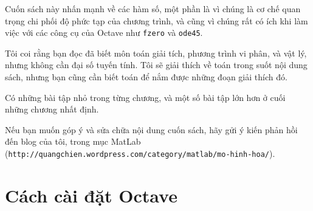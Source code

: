 \documentclass[12pt]{book}
\begin{document}
Cuốn sách này nhấn mạnh về các hàm số, một phần là vì chúng là 
cơ chế quan trọng chi phối độ phức tạp của chương trình, và cũng 
vì chúng rất có ích khi làm việc với các công cụ của Octave như 
{\tt fzero} và {\tt ode45}.

Tôi coi rằng bạn đọc đã biết môn toán giải tích, phương trình vi phân,
và vật lý, nhưng không cần đại số tuyến tính. Tôi sẽ giải thích về toán
trong suốt nội dung sách, nhưng bạn cũng cần biết toán để nắm được
những đoạn giải thích đó.

Có những bài tập nhỏ trong từng chương, và một số bài tập lớn hơn
ở cuối những chương nhất định.

Nếu bạn muốn góp ý và sửa chữa nội dung cuốn sách, hãy gửi ý kiến
phản hồi đến blog của tôi, trong mục MatLab 
({\tt http://quangchien.wordpress.com/category/matlab/mo-hinh-hoa/}).



\tableofcontents

\mainmatter

\chapter*{Cách cài đặt Octave}
\end{document}
